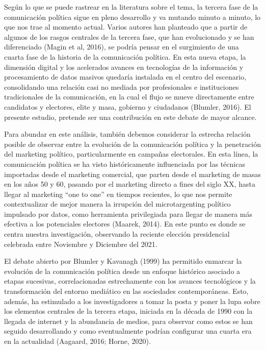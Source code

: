 \documentclass[
  10pt,
  letterpaper,
]{report}
\begin{document}
Según lo que se puede rastrear en la literatura sobre el tema, la
tercera fase de la comunicación política sigue en pleno desarrollo y va
mutando minuto a minuto, lo que nos trae al momento actual. Varios
autores han planteado que a partir de algunos de los rasgos centrales de
la tercera fase, que han evolucionado y se han diferenciado (Magin et
al, 2016), se podría pensar en el surgimiento de una cuarta fase de la
historia de la comunicación política. En esta nueva etapa, la dimensión
digital y los acelerados avances en tecnologías de la información y
procesamiento de datos masivos quedaría instalada en el centro del
escenario, consolidando una relación casi no mediada por profesionales e
instituciones tradicionales de la comunicación, en la cual el flujo se
mueve directamente entre candidatos y electores, elite y masa, gobierno
y ciudadanos (Blumler, 2016). El presente estudio, pretende ser una
contribución en este debate de mayor alcance.

Para abundar en este análisis, también debemos considerar la estrecha
relación posible de observar entre la evolución de la comunicación
política y la penetración del marketing político, particularmente en
campañas electorales. En esta línea, la comunicación política se ha
visto históricamente influenciada por las técnicas importadas desde el
marketing comercial, que parten desde el marketing de masas en los años
50 y 60, pasando por el marketing directo a fines del siglo XX, hasta
llegar al marketing ``one to one'' en tiempos recientes, lo que nos
permite contextualizar de mejor manera la irrupción del microtargenting
político impulsado por datos, como herramienta privilegiada para llegar
de manera más efectiva a los potenciales electores (Maarek, 2014). En
este punto es donde se centra nuestra investigación, observando la
reciente elección presidencial celebrada entre Noviembre y Diciembre del
2021.

El debate abierto por Blumler y Kavanagh (1999) ha permitido enmarcar la
evolución de la comunicación política desde un enfoque histórico
asociado a etapas sucesivas, correlacionadas estrechamente con los
avances tecnológicos y la transformación del entorno mediático en las
sociedades contemporáneas. Esto, además, ha estimulado a los
investigadores a tomar la posta y poner la lupa sobre los elementos
centrales de la tercera etapa, iniciada en la década de 1990 con la
llegada de internet y la abundancia de medios, para observar como estos
se han seguido desarrollando y como eventualmente podrían configurar una
cuarta era en la actualidad (Aagaard, 2016; Horne, 2020).
\end{document}
